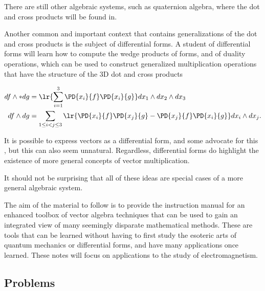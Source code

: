 There are still other algebraic systems, such as quaternion algebra, where the dot and cross products will be found in.

Another common and important context that contains generalizations of the dot and cross products is the subject of differential forms.
A student of differential forms will learn how to compute the wedge products of forms, and of duality operations, which can be used to construct generalized multiplication operations that have the structure of the 3D dot and cross products

\begin{equation}\label{eqn:GAmotivation:160}
\begin{aligned}
df \wedge * dg &= \lr{ \sum_{i=1}^3 \PD{x_i}{f} \PD{x_i}{g} } dx_1 \wedge dx_2 \wedge dx_3 \\
df \wedge dg &= \sum_{1 \le i < j \le 3} \lr{
\PD{x_i}{f} \PD{x_j}{g}
-\PD{x_j}{f} \PD{x_i}{g}
}
dx_i \wedge dx_j.
\end{aligned}
\end{equation}

It is possible to express vectors as a differential form, and some advocate for this \citep{flanders1989dfa}, but this can also seem unnatural.  Regardless, differential forms do highlight the existence of more general concepts of vector multiplication.  %

It should not be surprising that all of these ideas are special cases of a more general algebraic system.

The aim of the material to follow is to provide the instruction manual for an enhanced toolbox of vector algebra techniques that can be used to gain an integrated view of many seemingly disparate mathematical methods.  These are tools that can be learned without having to first study the esoteric arts of quantum mechanics or differential forms, and have many applications once learned.  These notes will focus on applications to the study of electromagnetism.

\subsection{Problems}



